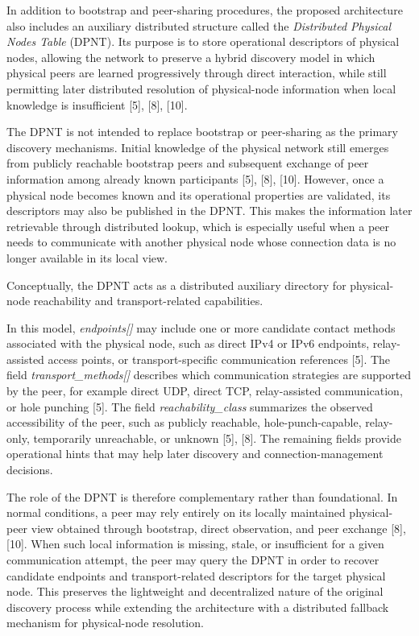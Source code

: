 \documentclass[12pt,a4paper]{article}
\begin{document}
In addition to bootstrap and peer-sharing procedures, the proposed architecture also includes an auxiliary distributed structure called the \textit{Distributed Physical Nodes Table} (DPNT). Its purpose is to store operational descriptors of physical nodes, allowing the network to preserve a hybrid discovery model in which physical peers are learned progressively through direct interaction, while still permitting later distributed resolution of physical-node information when local knowledge is insufficient [5], [8], [10].

The DPNT is not intended to replace bootstrap or peer-sharing as the primary discovery mechanisms. Initial knowledge of the physical network still emerges from publicly reachable bootstrap peers and subsequent exchange of peer information among already known participants [5], [8], [10]. However, once a physical node becomes known and its operational properties are validated, its descriptors may also be published in the DPNT. This makes the information later retrievable through distributed lookup, which is especially useful when a peer needs to communicate with another physical node whose connection data is no longer available in its local view.

Conceptually, the DPNT acts as a distributed auxiliary directory for physical-node reachability and transport-related capabilities. 

In this model, \textit{endpoints[]} may include one or more candidate contact methods associated with the physical node, such as direct IPv4 or IPv6 endpoints, relay-assisted access points, or transport-specific communication references [5]. The field \textit{transport\_methods[]} describes which communication strategies are supported by the peer, for example direct UDP, direct TCP, relay-assisted communication, or hole punching [5]. The field \textit{reachability\_class} summarizes the observed accessibility of the peer, such as publicly reachable, hole-punch-capable, relay-only, temporarily unreachable, or unknown [5], [8]. The remaining fields provide operational hints that may help later discovery and connection-management decisions.

The role of the DPNT is therefore complementary rather than foundational. In normal conditions, a peer may rely entirely on its locally maintained physical-peer view obtained through bootstrap, direct observation, and peer exchange [8], [10]. When such local information is missing, stale, or insufficient for a given communication attempt, the peer may query the DPNT in order to recover candidate endpoints and transport-related descriptors for the target physical node. This preserves the lightweight and decentralized nature of the original discovery process while extending the architecture with a distributed fallback mechanism for physical-node resolution.
\end{document}
